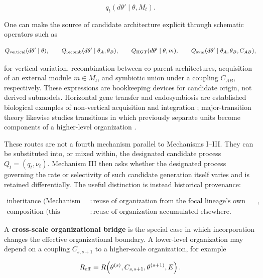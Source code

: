 \documentclass[11pt,a4paper]{article}
\begin{document}
\begin{equation}
q_t(d\theta'\mid\theta,M_t).
\label{eq:module-pool}
\end{equation}

One can make the source of candidate architecture explicit through schematic operators such as

\begin{equation*}
Q_{\rm vertical}(d\theta'\mid\theta),\qquad
Q_{\rm recomb}(d\theta'\mid\theta_A,\theta_B),\qquad
Q_{\rm HGT}(d\theta'\mid\theta,m),\qquad
Q_{\rm sym}(d\theta'\mid\theta_A,\theta_B,C_{AB}),
\end{equation*}

for vertical variation, recombination between co-parent architectures, acquisition of an external module $m\in M_t$, and symbiotic union under a coupling $C_{AB}$, respectively. These expressions are bookkeeping devices for candidate origin, not derived submodels. Horizontal gene transfer and endosymbiosis are established biological examples of non-vertical acquisition and integration \citep{Soucy2015,Archibald2015}; major-transition theory likewise studies transitions in which previously separate units become components of a higher-level organization \citep{SzathmarySmith1995}.

These routes are not a fourth mechanism parallel to Mechanisms I--III. They can be substituted into, or mixed within, the designated candidate process $Q_t=(q_t,\nu_t)$. Mechanism III then asks whether the designated process governing the rate or selectivity of such candidate generation itself varies and is retained differentially. The useful distinction is instead historical provenance:

\begin{equation*}
\boxed{
\begin{aligned}
\text{inheritance (Mechanism II)} &: \text{reuse of organization from the focal lineage's own history},\\
\text{composition (this section)} &: \text{reuse of organization accumulated elsewhere}.
\end{aligned}
}
\end{equation*}

A \textbf{cross-scale organizational bridge} is the special case in which incorporation changes the effective organizational boundary. A lower-level organization may depend on a coupling $C_{s,s+1}$ to a higher-scale organization, for example

\begin{equation*}
R_{\rm eff}=R\!\left(\theta^{(s)},C_{s,s+1},\theta^{(s+1)},E\right).
\end{equation*}
\end{document}

